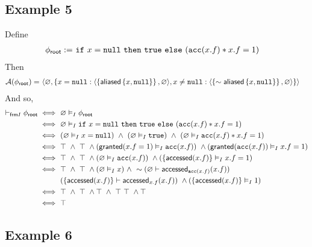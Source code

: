 \newpage
\subsection*{Example 5}

Define
\begin{align*}
{\phi_\textsf{root}} := & \
\texttt{if} \ x = \texttt{null} \ \texttt{then} \ \texttt{true} \ \texttt{else} \ (\texttt{acc}(x.f) \ast x.f = 1)
\end{align*}
Then
\begin{align*}
\mathcal{A}({\phi_\textsf{root}}) = & \
\langle \varnothing, \left\{ 
  x = \texttt{null}: \langle \left\{  \textsf{aliased}\left\{ x, \texttt{null} \right\}  \right\}, \varnothing \rangle,
  x \neq \texttt{null}: \langle \left\{  \sim\textsf{aliased}\left\{ x, \texttt{null} \right\}  \right\}, \varnothing \rangle
 \right\} \rangle
\end{align*}
And so,
\begin{align*}
\vdash_{\textsf{frm}I} {\phi_\textsf{root}}
\iff & \
\varnothing \vDash_I {\phi_\textsf{root}}
\\ \iff & \
  \varnothing
  \vDash_I
  \texttt{if} \ x = \texttt{null} \ \texttt{then} \ \texttt{true} \ \texttt{else} \ (\texttt{acc}(x.f) \ast x.f = 1)
\\ \iff & \
  (\varnothing \vDash_I x = \texttt{null}) \ \land \
  (\varnothing \vDash_I \texttt{true}) \ \land \
  (\varnothing \vDash_I \texttt{acc}(x.f) \ast x.f = 1)
\\ \iff & \
  \top \ \land \ \top \ \land
  ( \textsf{granted}(x.f = 1) \vDash_I \texttt{acc}(x.f) ) \ \land
  ( \textsf{granted}(\texttt{acc}(x.f)) \vDash_I x.f = 1 )
\\ \iff & \
  \top \ \land \ \top \ \land
  ( \varnothing \vDash_I \texttt{acc}(x.f) ) \ \land
  ( \left\{  \textsf{accessed}(x.f)  \right\} \vDash_I x.f = 1 )
\\ \iff & \
  \top \ \land \ \top \ \land
  ( \varnothing \vDash_I x ) \ \land \ \sim (\varnothing \vdash \textsf{accessed}_{\texttt{acc}(x.f)}(x.f) ) \\ & \
  ( \left\{  \textsf{accessed}(x.f)  \right\} \vdash \textsf{accessed}_{x.f}(x.f) ) \ \land
  ( \left\{  \textsf{accessed}(x.f)  \right\} \vDash_I 1 )
\\ \iff & \
  \top \ \land \ \top \ \land
  \top \ \land \ \top \
  \top \ \land
  \top
\\ \iff & \
  \top
\end{align*}

\newpage
\subsection*{Example 6}

